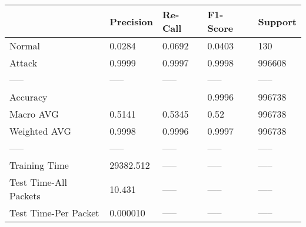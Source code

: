 \begin{tabular}{lllll}
\toprule
{} &  Precision & Re-Call & F1-Score & Support \\
\midrule
Normal                &     0.0284 &  0.0692 &   0.0403 &     130 \\
Attack                &     0.9999 &  0.9997 &   0.9998 &  996608 \\
-----                 &      ----- &   ----- &    ----- &   ----- \\
Accuracy              &            &         &   0.9996 &  996738 \\
Macro AVG             &     0.5141 &  0.5345 &     0.52 &  996738 \\
Weighted AVG          &     0.9998 &  0.9996 &   0.9997 &  996738 \\
-----                 &      ----- &   ----- &    ----- &   ----- \\
Training Time         &  29382.512 &   ----- &    ----- &   ----- \\
Test Time-All Packets &     10.431 &   ----- &    ----- &   ----- \\
Test Time-Per Packet  &   0.000010 &   ----- &    ----- &   ----- \\
\bottomrule
\end{tabular}
